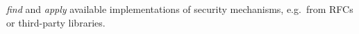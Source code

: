 \item \emph{find} and \emph{apply} available implementations of security 
  mechanisms, e.g.~from RFCs or third-party libraries.
